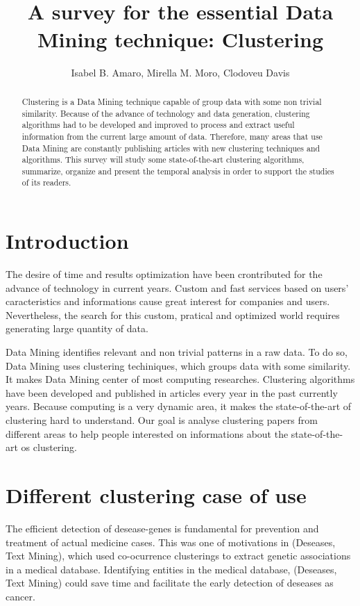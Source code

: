 \documentclass[12pt]{article}
\title{\\ A survey for the essential Data Mining technique: Clustering}
\author{Isabel B. Amaro\inst{1}, Mirella M. Moro\inst{2}, Clodoveu Davis\inst{3}}
\begin{document}
 

\maketitle

\begin{abstract}
Clustering is a Data Mining technique capable of group data with some non trivial similarity. Because of the advance of technology and data generation, clustering algorithms had to be developed and improved to process and extract useful information from the current large amount of data. Therefore, many areas that use Data Mining are constantly publishing articles with new clustering techniques and algorithms. This survey will study some state-of-the-art clustering algorithms, summarize, organize and present the temporal analysis in order to support the studies of its readers.
\end{abstract}

\section{Introduction}

\hspace{6ex} The desire of time and results optimization have been crontributed for the advance of technology in current years. Custom and fast services based on users' caracteristics and informations cause great interest for companies and users. Nevertheless, the search for this custom, pratical and optimized world requires generating large quantity of data.

Data Mining identifies relevant and non trivial patterns in a raw data. To do so, Data Mining uses clustering techiniques, which groups data with some similarity. It makes Data Mining center of most computing researches. Clustering algorithms have been developed and published in articles every year in the past currently years. Because computing is a very dynamic area, it makes the state-of-the-art of clustering hard to understand. Our goal is analyse clustering papers from different areas to help people interested on informations about the state-of-the-art os clustering.

\section{Different clustering case of use}

\hspace{6ex} The efficient detection of desease-genes is fundamental for prevention  and treatment of actual medicine cases. This was one of motivations in (Deseases, Text Mining), which used co-ocurrence clusterings to extract genetic associations in a medical database. Identifying entities in the medical database, (Deseases, Text Mining) could save time and facilitate the early detection of deseases as cancer.
\end{document}
